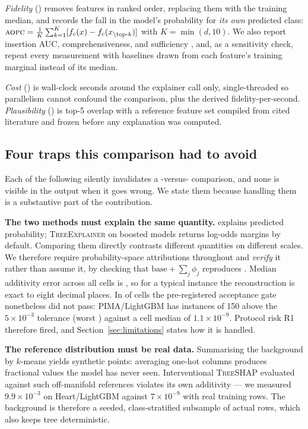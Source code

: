 \emph{Fidelity} () removes features in ranked order, replacing them with the
training median, and records the fall in the model's probability for \emph{its own}
predicted class: $\textsc{aopc}{} = \frac{1}{K}\sum_{k=1}^{K}[f_c(x)-f_c(x_{\setminus \text{top-}k})]$
with $K=\min(d,10)$. We also report insertion AUC, comprehensiveness, and sufficiency
\cite{deyoung2020eraser}, and, as a sensitivity check, repeat every measurement with
baselines drawn from each feature's training marginal instead of its median.

\emph{Cost} () is wall-clock seconds around the explainer call only,
single-threaded so parallelism cannot confound the comparison, plus the derived
fidelity-per-second. \emph{Plausibility} () is top-5 overlap with a reference
feature set compiled from cited literature and frozen before any explanation was
computed.

\subsection{Four traps this comparison had to avoid}\label{sec:pitfalls}
Each of the following silently invalidates a \shap{}-versus-\lime{} comparison, and
none is visible in the output when it goes wrong. We state them because handling them
is a substantive part of the contribution.

\textbf{The two methods must explain the same quantity.} \lime{} explains predicted
probability; \textsc{TreeExplainer} on boosted models returns log-odds margins by
default. Comparing them directly contrasts different quantities on different scales.
We therefore require probability-space attributions throughout and \emph{verify} it
rather than assume it, by checking that $\text{base} + \sum_j \phi_j$ reproduces
. Median additivity error across all cells is
\AdditivityMedianMax{}, so for a typical instance the reconstruction is exact to eight
decimal places. In \AdditivityGateFailCells{} of \NumCells{} cells the pre-registered
acceptance gate nonetheless did not pass: PIMA/LightGBM has
\AdditivityWorstOutliers{} instances of 150 above the $5\times10^{-3}$ tolerance
(worst \AdditivityWorstMax{}) against a cell median of $1.1\times10^{-9}$. Protocol
risk R1 therefore fired, and Section~\ref{sec:limitations} states how it is handled.

\textbf{The reference distribution must be real data.} Summarising the \shap{}
background by $k$-means yields synthetic points: averaging one-hot columns produces
fractional values the model has never seen. Interventional \textsc{TreeSHAP} evaluated
against such off-manifold references violates its own additivity --- we measured
$9.9\times10^{-3}$ on Heart/LightGBM against $7\times10^{-9}$ with real training rows.
The background is therefore a seeded, class-stratified subsample of actual rows, which
also keeps tree \shap{} deterministic.

